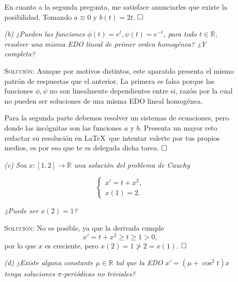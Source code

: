 \documentclass{article}
\begin{document}
\begin{enumerate}
\begin{enumerate}
        En cuanto a la segunda pregunta, me satisface anunciarles que existe la posibilidad. Tomando $a \equiv 0$ y $b(t) = 2t$. $\hfill\square$

        \vspace{7px}

        \item[\textit{(b)}] \textit{¿Pueden las funciones $\phi(t) = e^t, \psi(t) = e^{-t}$, para todo $t \in \mathbb{R}$, resolver una misma EDO lineal de primer orden homogénea? ¿Y completa?}

        \vspace{7px}

        \textsc{Solución}: Aunque por motivos distintos, este aparatdo presenta el mismo patrón de respuestas que el anterior. La primera es falsa porque las funciones $\phi, \psi$ no son linealmente dependientes entre si, razón por la cual no pueden ser soluciones de una misma EDO lineal homogénea.

        Para la segunda parte debemos resolver un sistemas de ecuaciones, pero donde las incógnitas son las funciones $a$ y $b$. Presenta un mayor reto redactar su resolución en \LaTeX \, que intentar valerte por tus propios medios, es por eso que te es delegada dicha tarea. $\hfill\square$

        \vspace{7px}

        \item[\textit{(c)}] \textit{Sea $x : [1, 2] \rightarrow \mathbb{R}$ una solución del problema de Cauchy}
        
        \[
        \begin{cases}
            x' = t + x^2, \\
            x(1) = 2.
        \end{cases}
        \]

        \textit{¿Puede ser $x(2) = 1$?}

        \vspace{7px}

        \textsc{Solución}: No es posible, ya que la derivada cumple \[x' = t + x^2 \geq t \geq 1 > 0,\] por lo que $x$ es creciente, pero $x(2) = 1 \not > 2 = x(1)$. $\hfill\square$

        \vspace{7px}

        \item[\textit{(d)}] \textit{¿Existe alguna constante $\mu \in \mathbb{R}$ tal que la EDO $x' = (\mu + \cos^2t)x$ tenga soluciones $\pi$-periódicas no triviales?}


\end{enumerate}
\end{enumerate}
\end{document}
